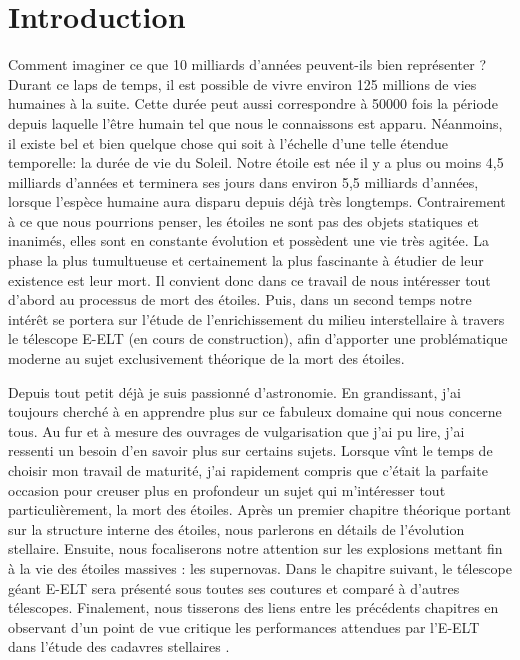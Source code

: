 

\chapter*{Introduction}


\vfill

Comment imaginer ce que 10 milliards d'années peuvent-ils bien représenter ? Durant ce laps de temps, il est possible de vivre environ 125 millions de vies humaines à la suite. Cette durée peut aussi correspondre à 50000 fois la période depuis laquelle l'être humain tel que nous le connaissons est apparu. Néanmoins, il existe bel et bien quelque chose qui soit à l'échelle d'une telle étendue temporelle: la durée de vie du Soleil. Notre étoile est née il y a plus ou moins 4,5 milliards d'années et terminera ses jours dans environ 5,5 milliards d'années, lorsque l'espèce humaine aura disparu depuis déjà très longtemps. Contrairement à ce que nous pourrions penser, les étoiles ne sont pas des objets statiques et inanimés, elles sont en constante évolution et possèdent une vie très agitée. La phase la plus tumultueuse et certainement la plus fascinante à étudier de leur existence est leur mort. Il convient donc dans ce travail de nous intéresser tout d'abord au processus de mort des étoiles. Puis, dans un second temps notre intérêt se portera sur l'étude de l'enrichissement du milieu interstellaire à travers le télescope E-ELT (en cours de construction), afin d'apporter une problématique moderne au sujet exclusivement théorique de la mort des étoiles.\smallskip

Depuis tout petit déjà je suis passionné d'astronomie. En grandissant, j'ai toujours cherché à en apprendre plus sur ce fabuleux domaine qui nous concerne tous. Au fur et à mesure des ouvrages de vulgarisation que j'ai pu lire, j'ai ressenti un besoin d'en savoir plus sur certains sujets. Lorsque vînt le temps de choisir mon travail de maturité, j'ai rapidement compris que c'était la parfaite occasion pour creuser plus en profondeur un sujet qui m'intéresser tout particulièrement, la mort des étoiles. Après un premier chapitre théorique portant sur la structure interne des étoiles, nous parlerons en détails de l'évolution stellaire. Ensuite, nous focaliserons notre attention sur les explosions mettant fin à la vie des étoiles massives : les supernovas. Dans le chapitre suivant, le télescope géant E-ELT sera présenté sous toutes ses coutures et comparé à d'autres télescopes. Finalement, nous tisserons des liens entre les précédents chapitres en observant d'un point de vue critique les performances attendues par l'E-ELT dans l'étude des cadavres stellaires . 

\vfill

